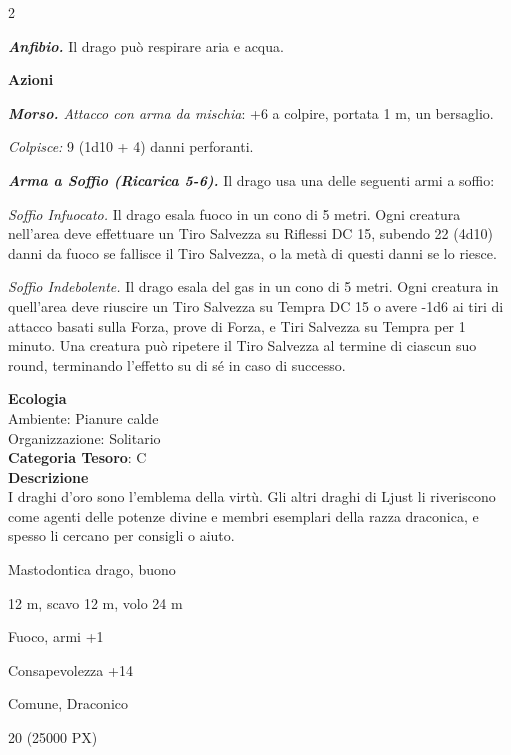 \begin{multicols}{2}
{\emph{\textbf{Anfibio.}} Il drago può respirare aria e acqua.

\textbf{Azioni}

\emph{\textbf{Morso.} Attacco con arma da mischia}: +6 a colpire, portata 1 m, un bersaglio.

\emph{Colpisce:} 9 (1d10 + 4) danni perforanti.

\emph{\textbf{Arma a Soffio (Ricarica 5-6).}} Il drago usa una delle seguenti armi a soffio:

\emph{Soffio Infuocato.} Il drago esala fuoco in un cono di 5 metri. Ogni creatura nell'area deve effettuare un Tiro Salvezza su Riflessi DC 15, subendo 22 (4d10) danni da fuoco se fallisce il Tiro Salvezza, o la metà di questi danni se lo riesce.

\emph{Soffio Indebolente.} Il drago esala del gas in un cono di 5 metri. Ogni creatura in quell'area deve riuscire un Tiro Salvezza su Tempra DC 15 o avere -1d6 ai tiri di attacco basati sulla Forza, prove di Forza, e Tiri Salvezza su Tempra per 1 minuto. Una creatura può ripetere il Tiro Salvezza al termine di ciascun suo round, terminando l'effetto su di sé in caso di successo.

\textbf{Ecologia}\\
Ambiente: Pianure calde\\
Organizzazione: Solitario\\
\textbf{Categoria Tesoro}: C\\
\textbf{Descrizione}\\
I draghi d'oro sono l'emblema della virtù. Gli altri draghi di Ljust li riveriscono come agenti delle potenze divine e membri esemplari della razza draconica, e spesso li cercano per consigli o aiuto.

\begin{description}[noitemsep, topsep=0pt, parsep=0pt, partopsep=0pt, itemsep=1pt, leftmargin=2.35cm,  labelwidth=2.2cm, itemindent=0cm, listparindent=0pt] %
\setlength{\baselineskip}{10pt}
\item[\textbf{Taglia/Tipo}] Mastodontica drago, buono
\item[\textbf{Caratt.}] 
\item[\textbf{Punti Ferita}] 
\item[\textbf{Movimento}] 12 m, scavo 12 m, volo 24 m
\item[\textbf{Tiri Salvez.}] 
\item[\textbf{Imm. Danni}] Fuoco, armi +1
\item[\textbf{Comp.}] Consapevolezza +14
\item[\textbf{Sensi}] 
\item[\textbf{Linguaggi}] Comune, Draconico
\item[\textbf{Sfida}] 20 (25000 PX)
\end{description}
\smallskip

}
\end{multicols}
